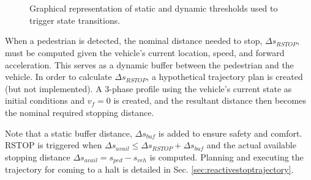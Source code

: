 \documentclass[letterpaper, 10 pt, conference]{ieeeconf}  %
\begin{document}
\begin{figure}[tb]
\centering
  \\
  \\
  \caption{Graphical representation of static and dynamic thresholds used to trigger state transitions.}
  \label{fig:react}
\end{figure}

When a pedestrian is detected, the nominal distance needed to stop, $\Delta s_{RSTOP}$, must be computed given the vehicle's current location, speed, and forward acceleration.
This serves as a dynamic buffer between the pedestrian and the vehicle.
In order to calculate $\Delta s_{RSTOP}$, a hypothetical trajectory plan is created (but not implemented).
A 3-phase profile using the vehicle's current state as initial conditions and $v_f = 0$ is created, and the resultant distance then becomes the nominal required stopping distance.

Note that a static buffer distance, $\Delta s_{buf}$ is added to ensure safety and comfort.
RSTOP is triggered when $\Delta s_{avail} \leqslant \Delta s_{RSTOP} + \Delta s_{buf}$ and the actual available stopping distance $\Delta s_{avail} = s_{ped} - s_{veh}$ is computed.
Planning and executing the trajectory for coming to a halt is detailed in Sec. \ref{sec:reactivestoptrajectory}.
\end{document}
